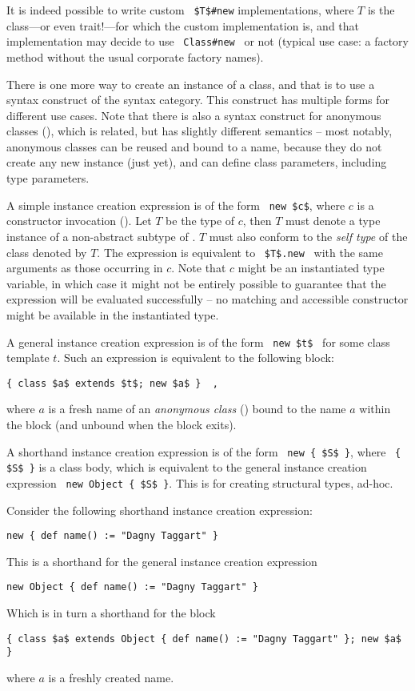 It is indeed possible to write custom ~\lstinline[deletekeywords={new}]!$T$#new! implementations, where $T$ is the class---or even trait!---for which the custom implementation is, and that implementation may decide to use ~\lstinline[deletekeywords={new}]!Class#new!~ or not (typical use case: a factory method without the usual corporate factory names).

There is one more way to create an instance of a class, and that is to use a syntax construct of the  syntax category. This construct has multiple forms for different use cases. Note that there is also a syntax construct for anonymous classes (), which is related, but has slightly different semantics -- most notably, anonymous classes can be reused and bound to a name, because they do not create any new instance (just yet), and can define class parameters, including type parameters. 

A simple instance creation expression is of the form ~\lstinline!new $c$!, where $c$ is a constructor invocation (). Let $T$ be the type of $c$, then $T$ must denote a type instance of a non-abstract subtype of . $T$ must also conform to the {\em self type} of the class denoted by $T$. The expression is equivalent to ~\lstinline[deletekeywords={new}]!$T$.new!~ with the same arguments as those occurring in $c$. Note that $c$ might be an instantiated type variable, in which case it might not be entirely possible to guarantee that the expression will be evaluated successfully -- no matching and accessible constructor might be available in the instantiated type. 

A general instance creation expression is of the form ~\lstinline!new $t$!~ for some class template $t$. Such an expression is equivalent to the following block:
\begin{lstlisting}
{ class $a$ extends $t$; new $a$ }  ,
\end{lstlisting}
where $a$ is a fresh name of an {\em anonymous class} () bound to the name $a$ within the block (and unbound when the block exits).

A shorthand instance creation expression is of the form ~\lstinline!new { $S$ }!, where ~\lstinline!{ $S$ }! is a class body, which is equivalent to the general instance creation expression ~\lstinline!new Object { $S$ }!. This is for creating structural types, ad-hoc. 

\example Consider the following shorthand instance creation expression:
\begin{lstlisting}
new { def name() := "Dagny Taggart" }
\end{lstlisting}
This is a shorthand for the general instance creation expression
\begin{lstlisting}
new Object { def name() := "Dagny Taggart" }
\end{lstlisting}
Which is in turn a shorthand for the block
\begin{lstlisting}
{ class $a$ extends Object { def name() := "Dagny Taggart" }; new $a$ }
\end{lstlisting}
where $a$ is a freshly created name. 




